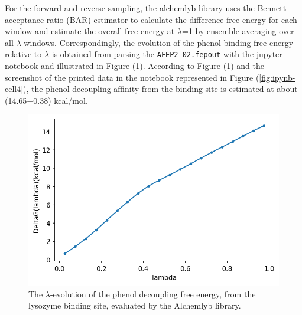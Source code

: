 \documentclass[9pt,tutorial]{livecoms}
\begin{document}
For the forward and reverse sampling, the alchemlyb library uses the Bennett acceptance ratio (BAR) estimator to calculate the difference free energy for each window and estimate the overall free energy at {$\lambda$}=1 by ensemble averaging over all {$\lambda$}-windows. Correspondingly, the evolution of the phenol binding free energy relative to {$\lambda$} is obtained from parsing the \texttt{AFEP2-02.fepout} with the jupyter notebook and illustrated in Figure (\ref{fig:AFEP-decoupling1}). According to Figure (\ref{fig:AFEP-decoupling1}) and the screenshot of the printed data in the notebook represented in Figure (\ref{fig:ipynb-cell4}), the phenol decoupling affinity from the binding site is estimated at about (14.65$\pm$0.38) kcal/mol.

\begin{figure}[th!]
\centering
\includegraphics[width=\linewidth]{Supp-Files/AFEP-Bound-Decoupling/output/Alchemlyb/output_4_1.png}
\caption{The {$\lambda$}-evolution of the phenol decoupling free energy, from the lysozyme binding site, evaluated by the Alchemlyb library.}\label{fig:AFEP-decoupling1}
\end{figure}
\end{document}
